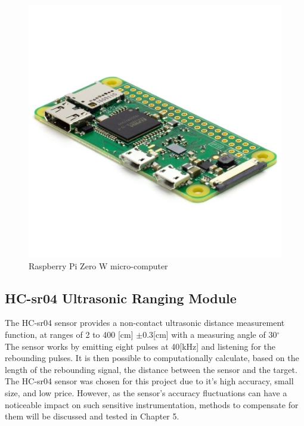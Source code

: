 \documentclass[twoside]{ctuthesis}
\theoremstyle{plain}
\theoremstyle{definition}
\theoremstyle{note}
\begin{document}
\begin{figure}[H]
	\centering
	\includegraphics[scale=0.15]{RasPIZeroW}
	\caption{Raspberry Pi Zero W micro-computer \cite{RasPi0W}}
\end{figure}


\subsection{HC-sr04 Ultrasonic Ranging Module}
The HC-sr04 sensor provides a non-contact ultrasonic distance measurement function, at ranges of 2 to 400 [cm] $\pm$0.3[cm] with a measuring angle of 30$^\circ$\\
The sensor works by emitting eight pulses at 40[kHz] and listening for the rebounding pulses. It is then possible to computationally calculate, based on the length of the rebounding signal, the distance between the sensor and the target.\\
The HC-sr04 sensor was chosen for this project due to it's high accuracy, small size, and low price. However, as the sensor's accuracy fluctuations can have a noticeable impact on such sensitive instrumentation, methods to compensate for them will be discussed and tested in Chapter 5.\\
\end{document}

